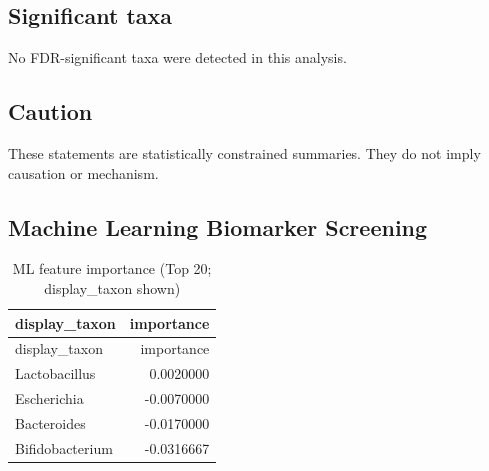\documentclass[
  letterpaper,
  DIV=11,
  numbers=noendperiod]{scrartcl}
\begin{document}
\subsection{Significant taxa}\label{significant-taxa}

No FDR-significant taxa were detected in this analysis.

\subsection{Caution}\label{caution}

These statements are statistically constrained summaries. They do not
imply causation or mechanism.

\subsection{Machine Learning Biomarker
Screening}\label{machine-learning-biomarker-screening}

\begin{longtable}[]{@{}lr@{}}
\caption{ML feature importance (Top 20; display\_taxon
shown)}\tabularnewline
\toprule\noalign{}
display\_taxon & importance \\
\midrule\noalign{}
\endfirsthead
\toprule\noalign{}
display\_taxon & importance \\
\midrule\noalign{}
\endhead
\bottomrule\noalign{}
\endlastfoot
Lactobacillus & 0.0020000 \\
Escherichia & -0.0070000 \\
Bacteroides & -0.0170000 \\
Bifidobacterium & -0.0316667 \\
\end{longtable}
\end{document}
